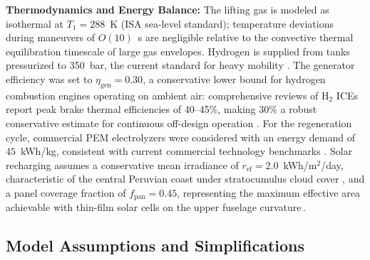 \documentclass[applsci,article,submit,pdftex,moreauthors]{Definitions/mdpi}
\begin{document}
\textbf{Thermodynamics and Energy Balance:} The lifting gas is modeled as isothermal at $T_1 = 288$~K (ISA sea-level standard); temperature deviations during maneuvers of $O(10)$~s are negligible relative to the convective thermal equilibration timescale of large gas envelopes. Hydrogen is supplied from tanks pressurized to 350~bar, the current standard for heavy mobility \cite{SAE2023}. The generator efficiency was set to $\eta_\text{gen} = 0.30$, a conservative lower bound for hydrogen combustion engines operating on ambient air: comprehensive reviews of H$_2$ ICEs report peak brake thermal efficiencies of 40--45\%, making 30\% a robust conservative estimate for continuous off-design operation \cite{ref9}. For the regeneration cycle, commercial PEM electrolyzers were considered with an energy demand of $45$~kWh/kg, consistent with current commercial technology benchmarks \cite{ref10, Buttler2018, Falcao2020}. Solar recharging assumes a conservative mean irradiance of $r_\text{ef} = 2.0$~kWh/m$^2$/day, characteristic of the central Peruvian coast under stratocumulus cloud cover \cite{SENAMHI2003}, and a panel coverage fraction of $f_\text{pan} = 0.45$, representing the maximum effective area achievable with thin-film solar cells on the upper fuselage curvature\,\cite{Gao2024}.


\subsection{Model Assumptions and Simplifications}
\end{document}
